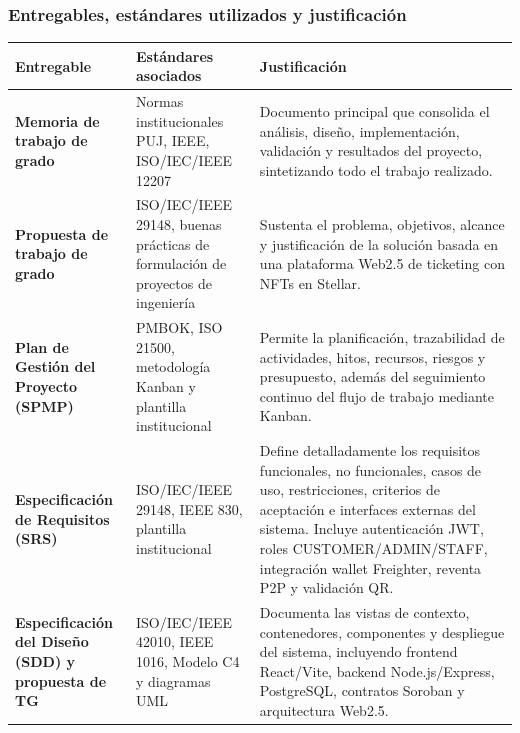 \documentclass[12pt,a4paper]{article}
\begin{document}
\subsubsection{Entregables, estándares utilizados y justificación}
\vspace{-0.5cm}
\begin{table}[H]
\centering
\scriptsize
\renewcommand{\arraystretch}{1.2}
\setlength{\tabcolsep}{4pt}

\begin{tabularx}{\textwidth}{|p{3.8cm}|p{4cm}|X|}
\hline
\textbf{Entregable} & \textbf{Estándares asociados} & \textbf{Justificación} \\
\hline

\textbf{Memoria de trabajo de grado} &
Normas institucionales PUJ, IEEE, ISO/IEC/IEEE 12207 &
Documento principal que consolida el análisis, diseño, implementación, validación y resultados del proyecto, sintetizando todo el trabajo realizado. \\
\hline

\textbf{Propuesta de trabajo de grado} &
ISO/IEC/IEEE 29148, buenas prácticas de formulación de proyectos de ingeniería &
Sustenta el problema, objetivos, alcance y justificación de la solución basada en una plataforma Web2.5 de ticketing con NFTs en Stellar. \\
\hline

\textbf{Plan de Gestión del Proyecto (SPMP)} &
PMBOK, ISO 21500, metodología Kanban y plantilla institucional &
Permite la planificación, trazabilidad de actividades, hitos, recursos, riesgos y presupuesto, además del seguimiento continuo del flujo de trabajo mediante Kanban. \\
\hline

\textbf{Especificación de Requisitos (SRS)} &
ISO/IEC/IEEE 29148, IEEE 830, plantilla institucional &
Define detalladamente los requisitos funcionales, no funcionales, casos de uso, restricciones, criterios de aceptación e interfaces externas del sistema. Incluye autenticación JWT, roles CUSTOMER/ADMIN/STAFF, integración wallet Freighter, reventa P2P y validación QR. \\
\hline

\textbf{Especificación del Diseño (SDD) y propuesta de TG} &
ISO/IEC/IEEE 42010, IEEE 1016, Modelo C4 y diagramas UML &
Documenta las vistas de contexto, contenedores, componentes y despliegue del sistema, incluyendo frontend React/Vite, backend Node.js/Express, PostgreSQL, contratos Soroban y arquitectura Web2.5. \\
\hline


\end{tabularx}
\end{table}
\end{document}
